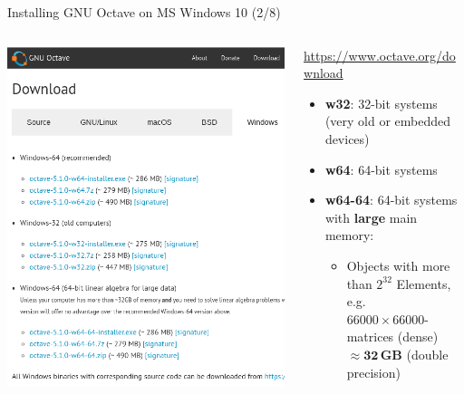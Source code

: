 \begin{frame}{Installing GNU Octave on MS Windows 10 (2/8)}
\begin{columns}
\begin{column}{0.35\textwidth}
\includegraphics[width=\textwidth]{res/ms_windows/win_download_cropped.png}
\end{column}
\begin{column}{0.6\textwidth}
{\Large\color{DarkBlue}\url{https://www.octave.org/download}}\\[1em]

\begin{itemize}
\itemsep1em
\item
\textbf{w32}: 32-bit systems (very old or embedded devices)

\item
\textbf{w64}: 64-bit systems \greencheck

\item
\textbf{w64-64}: 64-bit systems with \textbf{large} main memory:\\[1em]
\begin{itemize}
\item
Objects with more than $2^{32}$ Elements, e.g.\\[1em]

$\num{66000}\times\num{66000}$-matrices (dense)\\[1em]

$\approx\mathbf{32 \,GB}$ (double precision)
\end{itemize}
\end{itemize}
\end{column}
\end{columns}
\end{frame}



